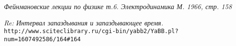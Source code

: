 \documentclass{article}
\begin{document}
\begin{thebibliography}{99}



\textit{Фейнмановские лекции по физике т.6. Электродинамика М. 1966, стр. 158}

\textit{Re: Интервал запаздывания и запаздывающее время.}
\\\texttt{http://www.sciteclibrary.ru/cgi-bin/yabb2/YaBB.pl?num=1607492586/164\#164}








\end{thebibliography}
\end{document}
